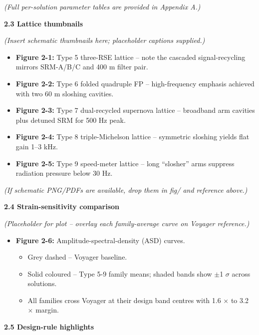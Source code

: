 \documentclass[]{article}
\begin{document}
\emph{(Full per-solution parameter tables are provided in Appendix A.)}

\textbf{2.3 Lattice thumbnails}

\emph{(Insert schematic thumbnails here; placeholder captions
supplied.)}

\begin{itemize}
\item
  \textbf{Figure 2-1:} Type 5 three-RSE lattice -- note the cascaded
  signal-recycling mirrors SRM-A/B/C and 400 m filter pair.
\item
  \textbf{Figure 2-2:} Type 6 folded quadruple FP -- high-frequency
  emphasis achieved with two 60 m sloshing cavities.
\item
  \textbf{Figure 2-3:} Type 7 dual-recycled supernova lattice --
  broadband arm cavities plus detuned SRM for 500 Hz peak.
\item
  \textbf{Figure 2-4:} Type 8 triple-Michelson lattice -- symmetric
  sloshing yields flat gain 1--3 kHz.
\item
  \textbf{Figure 2-5:} Type 9 speed-meter lattice -- long ``slosher''
  arms suppress radiation pressure below 30 Hz.
\end{itemize}

\emph{(If schematic PNG/PDFs are available, drop them in fig/ and
reference above.)}

\textbf{2.4 Strain-sensitivity comparison}

\emph{(Placeholder for plot -- overlay each family-average curve on
Voyager reference.)}

\begin{itemize}
\item
  \textbf{Figure 2-6:} Amplitude-spectral-density (ASD) curves.

  \begin{itemize}
  \item
    Grey dashed -- Voyager baseline.
  \item
    Solid coloured -- Type 5-9 family means; shaded bands show $\pm$1 $\sigma$
    across solutions.
  \item
    All families cross Voyager at their design band centres with 1.6 $\times$
    to 3.2 $\times$ margin.
  \end{itemize}
\end{itemize}

\textbf{2.5 Design-rule highlights}
\end{document}
